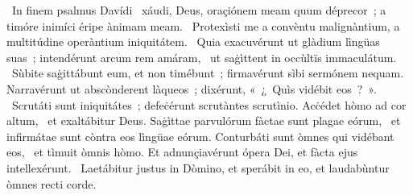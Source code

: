 {~In finem psalmus Davídi}
{%
~xáudi, Deus, oraçiónem meam quum déprecor~; a timóre inimíci éripe ànimam meam.
~Protexìsti me a convèntu malignàntium, a multitúdine operàntium iniquitátem.
~Quia exacuvérunt ut glàdium lìngüas suas~; intendérunt arcum rem amáram,
~ut saġìttent in occùltïs immaculátum.
~Sùbite saġittábunt eum, et non timébunt~; firmavérunt sìbi sermónem nequam. Narravérunt ut abscònderent làqueos~; dixérunt, «~¿~Quìs vidébit eos~?~».
~Scrutáti sunt iniquitátes~; defeċérunt scrutàntes scrutìnio. Acċédet hòmo ad cor altum,
~et exaltábitur Deus. Saġìttae parvulórum fàctae sunt plagae eórum,
~et infirmátae sunt còntra eos lìngüae eórum. Conturbáti sunt òmnes qui vidébant eos,
~et tìmuit òmnis hòmo. Et adnunçiavérunt ópera Dei, et fàcta ejus intellexérunt.
~Laetábitur justus in Dòmino, et sperábit in eo, et laudabùntur òmnes recti corde.}
